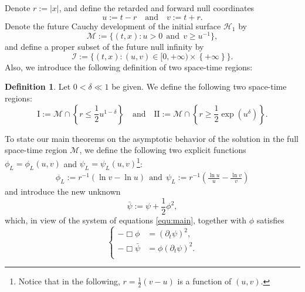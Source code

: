 \documentclass[a4paper,reqno]{amsart}
\theoremstyle{definition}
\newtheorem{definition}[theorem]{Definition}
\numberwithin{equation}{section}
\def \pt{\partial_{t}}
\def\MM{\mathcal{M}}
\def\lab{\label}
\begin{document}
Denote $r:=|x|$, 
and define the retarded and forward null coordinates
\begin{equation}
\lab{eq:coorduandv}
    u:=t-r\quad \mbox{and}\quad  v:=t+r.
\end{equation} 
Denote the future Cauchy development of the initial surface $\mathcal{H}_1$ by
\begin{equation}
\label{def:fullspacetimeregion}
\MM:=\{(t,x): u> 0 \ \ \mbox{and}\ \  v\geq u^{-1}\},
\end{equation} 
 and 
define a proper subset of the future null infinity by 
\begin{equation}
\lab{def:nullinfinitygeq0}
    \mathcal{I} := \{(t,x): (u,v)\in [0,+\infty)\times \left\{+\infty\right\}\}.
\end{equation} 
Also, we introduce the following definition of two space-time regions:
 \begin{definition}
 \label{def:regionsIandII:intro}
     Let $0<\delta\ll 1$ {be given}. We define the following two space-time regions:
     \begin{equation}
   \mathrm{I}:=\MM\cap\left\{r\le \frac{1}{2}u^{1-\delta}\right\}\quad 
         \mbox{and}\quad 
         \mathrm{II}:=\MM\cap\left\{r\ge \frac{1}{2}\exp({u^{\delta}})\right\}.
     \end{equation}
 \end{definition}




To state our main theorems on the asymptotic behavior of the solution in the full space-time region $\MM$, we define the following two explicit functions $\phi_{L}=\phi_{L}(u,v)$ and $\psi_{L}=\psi_{L}(u,v)$\footnote{Notice that in the following, $r=\frac{1}{2}(v-u)$ is a function of $(u,v)$.}: 
\begin{equation}
 \lab{eq:phibarandpsibar}
     \begin{aligned}
             \phi_{L}:=r^{-1}\left(\ln v-\ln u\right)\ \ \mbox{and}\ \  \psi_{L}:=r^{-1}\left(\frac{\ln u}{ u}-\frac{\ln v}{v}\right)
    \end{aligned}
\end{equation}
and introduce the new unknown 
   \begin{equation}
   \label{eq:definitionoftildepsi}
      \bar{\psi}:=\psi+\frac{1}{2}\phi^{2},
   \end{equation} 
  which,  in view of the system of equations \eqref{equ:main}, together with $\phi$ satisfies
\begin{equation}\label{equ:main-new}
    \left\{
    \begin{aligned}
        -\Box \phi&=\left(\pt \psi\right)^{2},
        \\
        -\Box \bar{\psi} &= \phi (\partial_t \psi)^2.
        \\
    \end{aligned}\right.
 \end{equation}
\end{document}
